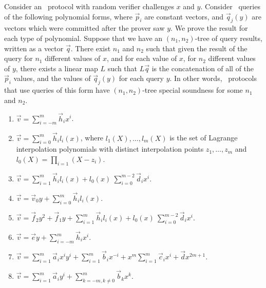 \begin{lemma}\label{lem:linextract}
Consider an \ILC\ protocol with random verifier challenges $x$ and $y$. Consider \ILC\ queries of the following polynomial forms, where $\vec{p}_i$ are constant vectors, and $\vec{q}_j(y)$ are vectors which were committed after the prover saw $y$. We prove the result for each type of polynomial. Suppose that we have an $(n_1,n_2)$-tree of query results, written as a vector $\vec{q}$. There exist $n_1$ and $n_2$ such that given the result of the query for $n_1$ different values of $x$, and for each value of $x$, for $n_2$ different values of $y$, there exists a linear map $L$ such that $L \vec{q}$ is the concatenation of all of the $\vec{p}_i$ values, and the values of $\vec{q}_j(y)$ for each query $y$. In other words, \ILC\ protocols that use queries of this form have $(n_1,n_2)$-tree special soundness for some $n_1$ and $n_2$.
\begin{enumerate}
\item $\vec{v} = \sum_{i=-m}^m \vec{h}_i x^i$.
\item $\vec{v} = \sum_{i=0}^m \vec{h}_i l_i(x)$, where $l_1(X),\ldots,l_m(X)$ is the set of Lagrange interpolation polynomials with distinct interpolation points $z_1,\ldots,z_m$ and $l_0(X) = \prod_{i=1}(X-z_i)$.
\item $\vec{v} = \sum_{i=1}^m \vec{h}_i l_i(x) + l_0(x) \ \sum_{i=0}^{m-2} \vec{d}_i x^i$.
\item $\vec{v} = \vec{v}_0 y + \sum_{i=0}^m \vec{h}_i l_i(x)$.
\item $\vec{v} = \vec{f}_2 y^2 + \vec{f}_1 y + \sum_{i=1}^m \vec{h}_i l_i(x) + l_0(x) \ \sum_{i=0}^{m-2} \vec{d}_i x^i$.
\item $\vec{v} = \vec{e} y + \sum_{i=-m}^m \vec{h}_i x^i$.
\item $\vec{v} = \sum_{i=1}^m \vec{a}_{i}x^{i} y^i+\sum_{i=1}^m\vec{b}_{i} x^{-i}+x^m \sum_{i=1}^m\vec{c}_{i} x^{i}+\vec{d}x^{2m+1}$.
\item $\vec{v} = \sum_{i=1}^m \vec{a}_i y^i + \sum_{k=-m,k\neq0}^m \vec{b}_k x^k$.
\end{enumerate}
\end{lemma}


